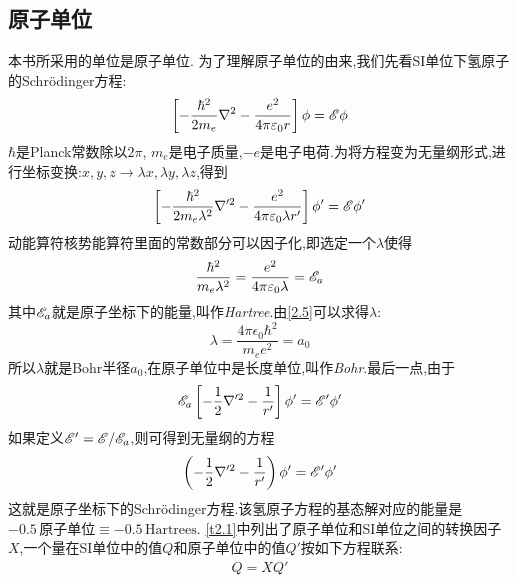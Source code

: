\subsection{原子单位}
\label{sec2.1.1}
本书所采用的单位是原子单位. 为了理解原子单位的由来,我们先看SI单位下氢原子的Schr\"odinger方程:
\begin{align}
\label{2.3}
\left[-\frac{\hbar^2}{2m_e}\nabla^2-\frac{e^2}{4\pi\varepsilon_0r}\right]\phi=\mathscr{E}\phi
\end{align}
$ \hbar $是Planck常数除以$ 2\pi $, $ m_e $是电子质量,$ -e $是电子电荷.为将方程变为无量纲形式,进行坐标变换:$x,y,z\to\lambda x,\lambda y,\lambda z$,得到
\begin{equation}
\label{2.4}
\left[-\frac{\hbar^2}{2m_e\lambda^2}\nabla'^2-\frac{e^2}{4\pi\varepsilon_0\lambda r'}\right]\phi'=\mathscr{E}\phi'
\end{equation}
动能算符核势能算符里面的常数部分可以因子化,即选定一个$ \lambda $使得
\begin{equation}
\label{2.5}
\frac{\hbar^2}{m_e\lambda^2}=\frac{e^2}{4\pi\varepsilon_0\lambda}=\mathscr{E}_a
\end{equation}
其中$ \mathscr{E}_a $就是原子坐标下的能量,叫作\emph{Hartree}.由\ref{2.5}可以求得$ \lambda $:
\begin{equation}
\label{2.6}
\lambda=\frac{4\pi\epsilon_0\hbar^2}{m_ee^2}=a_0
\end{equation}
所以$ \lambda $就是Bohr半径$ a_0 $,在原子单位中是长度单位,叫作\emph{Bohr}.最后一点,由于
\begin{equation}
\mathscr{E}_a\left[-\frac{1}{2}\nabla'^2-\frac{1}{r'}\right]\phi'=\mathscr{E}'\phi'	
\end{equation}
如果定义$ \mathscr{E}'=\mathscr{E}/\mathscr{E}_a $,则可得到无量纲的方程
\begin{equation}
\left(-\frac{1}{2}\nabla'^2-\frac{1}{r'}\right)\phi'=\mathscr{E}'\phi'
\end{equation}
这就是原子坐标下的Schr\"odinger方程.该氢原子方程的基态解对应的能量是$-0.5\,\text{原子单位}\equiv -0.5\,\text{Hartrees}$. \ref{t2.1}中列出了原子单位和SI单位之间的转换因子$ X $,一个量在SI单位中的值$ Q $和原子单位中的值$ Q' $按如下方程联系:
\begin{eqnarray}
\label{2.9}
Q=XQ'
\end{eqnarray}

